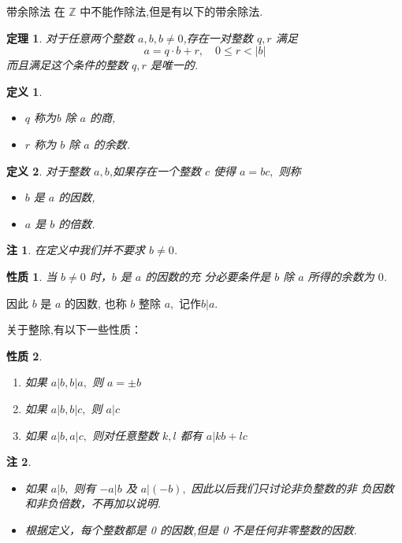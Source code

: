 \documentclass[13pt,fontset=mac]{ctexbeamer}
\newtheorem{thm}{定理}
\newtheorem*{defi}{定义}
\newtheorem*{rem}{注}
\newtheorem*{prop}{性质}
\begin{document}
\begin{frame}{带余除法}
在 $\mathbb{Z}$ 中不能作除法,但是有以下的\alert{带余除法}.  
\begin{thm}
对于任意两个整数 $a ,b,b\neq 0$,存在一对整数 $q, r$ 满足
\[
a=q \cdot b+r, \quad 0 \leqslant r<|b|
\]
而且满足这个条件的整数 $q, r$ 是唯一的. 
\end{thm}
\begin{defi}
\begin{itemize}
\item $q$ 称为b 除 $a$ 的\alert{商}, 
\item $r$ 称为 $b$ 除 $a$ 的\alert{余数}. 
\end{itemize}
\end{defi}
 
\end{frame}

\begin{frame}
\begin{defi}
	对于整数 $a ,b$,如果存在一个整数 $c$ 使得 $a=b c,$ 则称
\begin{itemize}
\item $b$ 是 $a$ 的\alert{因数}, 
\item $a$ 是 $b$ 的\alert{倍数}.
\end{itemize}
\end{defi}
\begin{rem}
在定义中我们并不要求 $b\neq0$. 
\end{rem}


\end{frame}

\begin{frame}

\begin{prop}
	当 $b\neq 0$ 时，$b$ 是 $a$ 的因数的充 分必要条件是 $b$ 除 $a$ 所得的余数为 $0$.
\end{prop}
因此 $b$ 是 $a$ 的因数, 也称 $b$ \alert{整除} $a,$ 记作$b | a$. 

关于整除,有以下一些性质：
\begin{prop}
\begin{enumerate}
\item 如果 $a|b, b| a,$ 则 $a=\pm b$
\item 如果 $a|b, b| c,$ 则 $a | c$
\item  如果 $a|b, a| c,$ 则对任意整数 $k, l$ 都有 $a | k b+l c$
\end{enumerate}
\end{prop}
\begin{rem}
\begin{itemize}
\item 如果 $a | b,$ 则有 $-a | b$ 及 $a |(-b),$ 因此以后我们只讨论\alert{非负整数}的\alert{非 负因数}和\alert{非负倍数}，不再加以说明.

\item 根据定义，每个整数都是 0 的因数,但是 0 不是任何非零整数的因数.
\end{itemize}
\end{rem}

\end{frame}
\end{document}
